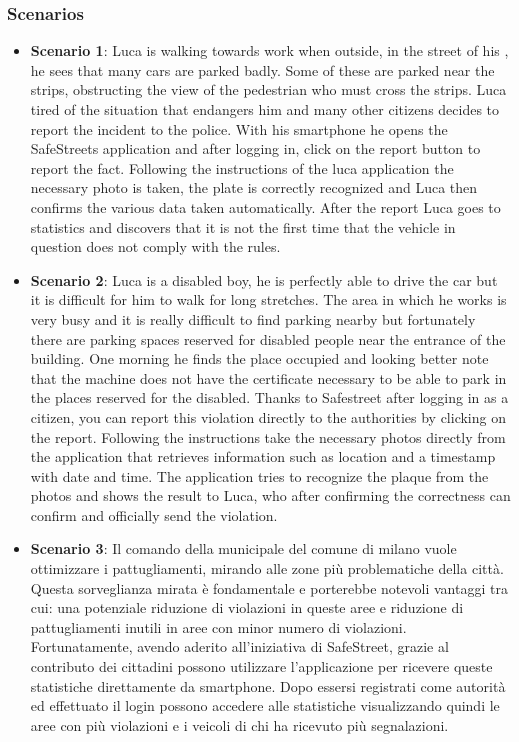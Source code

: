 \documentclass{article}
\begin{document}
\subsubsection{Scenarios}
\begin{itemize}
    \item \textbf{Scenario 1}:
    Luca is walking towards work when outside, in the street of his , he sees that many cars are parked badly. 
    Some of these are parked near the strips, obstructing the view of the pedestrian who must cross the strips. 
    Luca tired of the situation that endangers him and many other citizens decides to report the incident to the police. 
    With his smartphone he opens the SafeStreets application and after logging in, click on the report button to report the fact. 
    Following the instructions of the luca application the necessary photo is taken, the plate is correctly recognized and 
    Luca then confirms the various data taken automatically. After the report Luca goes to statistics and discovers that it 
    is not the first time that the vehicle in question does not comply with the rules.

    \item \textbf{Scenario 2}:
    Luca is a disabled boy, he is perfectly able to drive the car but it is difficult for him to walk for long stretches. 
    The area in which he works is very busy and it is really difficult to find parking nearby but fortunately there are parking 
    spaces reserved for disabled people near the entrance of the building. One morning he finds the place occupied and looking 
    better note that the machine does not have the certificate necessary to be able to park in the places reserved for the disabled. 
    Thanks to Safestreet after logging in as a citizen, you can report this violation directly to the authorities by clicking on the report. 
    Following the instructions take the necessary photos directly from the application that retrieves information such as location and a 
    timestamp with date and time. The application tries to recognize the plaque from the photos and shows the result to Luca, who after 
    confirming the correctness can confirm and officially send the violation.

    \item \textbf{Scenario 3}:
    Il comando della municipale del comune di milano vuole ottimizzare i pattugliamenti, mirando alle zone più problematiche della città. 
    Questa sorveglianza mirata è fondamentale e porterebbe notevoli vantaggi tra cui: una potenziale riduzione di violazioni in queste aree 
    e riduzione di pattugliamenti inutili in aree con minor numero di violazioni. Fortunatamente, avendo aderito all'iniziativa di SafeStreet, 
    grazie al contributo dei cittadini possono utilizzare l'applicazione per ricevere queste statistiche direttamente da smartphone. Dopo essersi 
    registrati come autorità ed effettuato il login possono accedere alle statistiche visualizzando quindi le aree con più violazioni e i veicoli 
    di chi ha ricevuto più segnalazioni.


\end{itemize}
\end{document}
